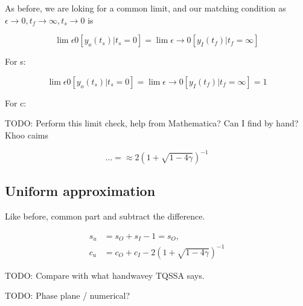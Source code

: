 \documentclass[12pt]{article}
\begin{document}
As before, we are loking for a common limit, and our matching condition as
$\epsilon \to 0, t_f \to \infty, t_s \to 0$ is

\begin{equation}
\lim \epsilon 0 [y_o(t_s)|t_s=0] = \lim \epsilon \to 0[y_I(t_f)|t_f=\infty]
\end{equation}

For s:

\begin{equation}
\lim \epsilon 0 [y_o(t_s)|t_s=0] = \lim \epsilon \to 0[y_I(t_f)|t_f=\infty] = 1
\end{equation}

For c:

TODO: Perform this limit check, help from Mathematica? Can I find by hand? Khoo
caims

\begin{equation}
... = \approx 2(1+\sqrt{1-4\gamma})^{-1}
\end{equation}

\subsection{Uniform approximation}

Like before, common part and subtract the difference.

\begin{align}
s_u &= s_O + s_I - 1 = s_O, \\
c_u &= c_O + c_I - 2(1 + \sqrt{1-4\gamma})^{-1}
\end{align}

TODO: Compare with what handwavey TQSSA says.

TODO: Phase plane / numerical?
\end{document}
